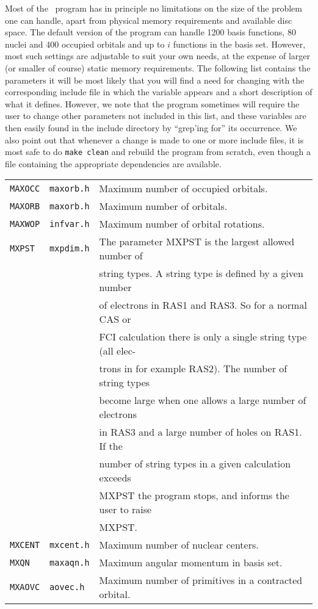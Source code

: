 Most of the \dalton\ program has in principle no limitations on
the size of the problem one can handle, apart from
physical memory requirements and available disc space. The default
version of the program can handle 1200 basis functions, 80 nuclei and
400 occupied orbitals and up to $i$ functions in the basis
set. However, most such settings are adjustable to suit your own
needs, at the expense of larger (or smaller of course) static memory
requirements. The following list contains the parameters it will be
most likely that you will find a need for changing with the
corresponding include 
file in which the variable appears and a short description of what
it defines. However, we note that the program sometimes will
require the user to change other parameters not included in this
list, and these variables are then easily found in the include
directory by ``grep'ing for'' its occurrence. We also point out that
whenever a change is made to one or more include files, it is most
safe to do \verb|make clean| and rebuild the program from scratch,
even though a file containing the appropriate dependencies are
available.

\bigskip

\begin{tabular}{lll}
\verb|MAXOCC| & \verb|maxorb.h| & Maximum number of occupied
orbitals.\index{occupied orbitals}\index{limits}\\
\verb|MAXORB| & \verb|maxorb.h| & Maximum number of
orbitals.\index{orbitals}\index{limits}\\
\verb|MAXWOP| & \verb|infvar.h| & Maximum number of orbital
rotations.\index{orbital rotations}\index{limits}\\
\verb|MXPST| & \verb|mxpdim.h| & The parameter MXPST is the largest
allowed number\index{string numbers}\index{limits} of \\ && string types.
A string type is defined by a given number \\&& of electrons in RAS1 and
RAS3. So for a normal CAS or \\ &&  FCI calculation there is only a
single string
type (all elec-\\&&trons in for example RAS2). The number of string types
 \\ & & become large when one allows a large number of electrons
 \\ &&  in  RAS3  and a large number of holes on RAS1. If the
 \\ && number of  string types
in a given calculation exceeds  \\&&  MXPST the program stops, and
informs the user to raise\\&& MXPST.\\
\verb|MXCENT| & \verb|mxcent.h| & Maximum number of nuclear
centers.\index{atomic centers}\index{limits}\\
\verb|MXQN| & \verb|maxaqn.h| & Maximum angular momentum in basis
set.\index{angular momentum}\index{limits}\\
\verb|MXAOVC| & \verb|aovec.h| & Maximum number of primitives in a
contracted orbital.\index{primitive orbitals}\index{limits}
\end{tabular}


